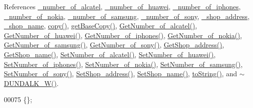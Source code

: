 References \hyperlink{_d_u_n_d_a_l_k___w_8h_source_l00116}{\+\_\+number\+\_\+of\+\_\+alcatel}, \hyperlink{_d_u_n_d_a_l_k___w_8h_source_l00114}{\+\_\+number\+\_\+of\+\_\+huawei}, \hyperlink{_d_u_n_d_a_l_k___w_8h_source_l00111}{\+\_\+number\+\_\+of\+\_\+iphones}, \hyperlink{_d_u_n_d_a_l_k___w_8h_source_l00115}{\+\_\+number\+\_\+of\+\_\+nokia}, \hyperlink{_d_u_n_d_a_l_k___w_8h_source_l00112}{\+\_\+number\+\_\+of\+\_\+samsung}, \hyperlink{_d_u_n_d_a_l_k___w_8h_source_l00113}{\+\_\+number\+\_\+of\+\_\+sony}, \hyperlink{_d_u_n_d_a_l_k___w_8h_source_l00109}{\+\_\+shop\+\_\+address}, \hyperlink{_d_u_n_d_a_l_k___w_8h_source_l00110}{\+\_\+shop\+\_\+name}, \hyperlink{_d_u_n_d_a_l_k___w_8cpp_source_l00035}{copy()}, \hyperlink{_d_u_n_d_a_l_k___w_8cpp_source_l00022}{get\+Base\+Copy()}, \hyperlink{_d_u_n_d_a_l_k___w_8cpp_source_l00073}{Get\+Number\+\_\+of\+\_\+alcatel()}, \hyperlink{_d_u_n_d_a_l_k___w_8cpp_source_l00089}{Get\+Number\+\_\+of\+\_\+huawei()}, \hyperlink{_d_u_n_d_a_l_k___w_8cpp_source_l00113}{Get\+Number\+\_\+of\+\_\+iphones()}, \hyperlink{_d_u_n_d_a_l_k___w_8cpp_source_l00081}{Get\+Number\+\_\+of\+\_\+nokia()}, \hyperlink{_d_u_n_d_a_l_k___w_8cpp_source_l00105}{Get\+Number\+\_\+of\+\_\+samsung()}, \hyperlink{_d_u_n_d_a_l_k___w_8cpp_source_l00097}{Get\+Number\+\_\+of\+\_\+sony()}, \hyperlink{_d_u_n_d_a_l_k___w_8cpp_source_l00129}{Get\+Shop\+\_\+address()}, \hyperlink{_d_u_n_d_a_l_k___w_8cpp_source_l00121}{Get\+Shop\+\_\+name()}, \hyperlink{_d_u_n_d_a_l_k___w_8cpp_source_l00069}{Set\+Number\+\_\+of\+\_\+alcatel()}, \hyperlink{_d_u_n_d_a_l_k___w_8cpp_source_l00085}{Set\+Number\+\_\+of\+\_\+huawei()}, \hyperlink{_d_u_n_d_a_l_k___w_8cpp_source_l00109}{Set\+Number\+\_\+of\+\_\+iphones()}, \hyperlink{_d_u_n_d_a_l_k___w_8cpp_source_l00077}{Set\+Number\+\_\+of\+\_\+nokia()}, \hyperlink{_d_u_n_d_a_l_k___w_8cpp_source_l00101}{Set\+Number\+\_\+of\+\_\+samsung()}, \hyperlink{_d_u_n_d_a_l_k___w_8cpp_source_l00093}{Set\+Number\+\_\+of\+\_\+sony()}, \hyperlink{_d_u_n_d_a_l_k___w_8cpp_source_l00125}{Set\+Shop\+\_\+address()}, \hyperlink{_d_u_n_d_a_l_k___w_8cpp_source_l00117}{Set\+Shop\+\_\+name()}, \hyperlink{_d_u_n_d_a_l_k___w_8cpp_source_l00062}{to\+String()}, and \hyperlink{_d_u_n_d_a_l_k___w_8cpp_source_l00012}{$\sim$\+D\+U\+N\+D\+A\+L\+K\+\_\+\+W()}.


\begin{DoxyCode}
00075 \{\};
\end{DoxyCode}


